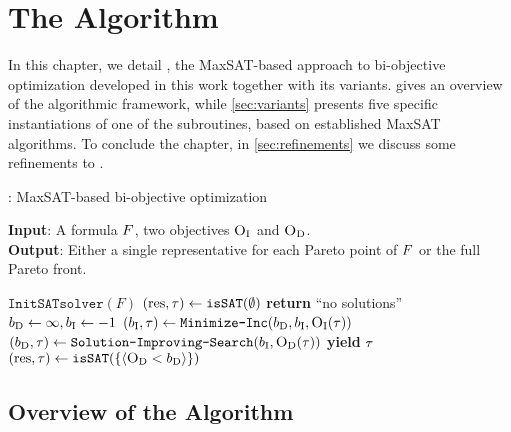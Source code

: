 \chapter{The \algname{} Algorithm\label{chap:approach}}

In this chapter, we detail \algname{}, the MaxSAT-based approach to bi-objective optimization developed in this work together with its variants.
 gives an overview of the algorithmic framework, while \cref{sec:variants} presents five specific instantiations of one of the subroutines, based on established MaxSAT algorithms.
To conclude the chapter, in \cref{sec:refinements} we discuss some refinements to \algname{}.

\begin{algorithm}[t]
  \caption{\algname{}: MaxSAT-based  bi-objective optimization} %
  \label{alg:base-algorithm}
  \textbf{Input}: A formula $F$, two objectives $\textsc{O}_{\text{I}}$ and $\textsc{O}_{\text{D}}$.\\
  \textbf{Output}: Either a single representative for each Pareto point of $F$ or the full Pareto front.

  \begin{algorithmic}[1]
    \STATE $\texttt{InitSATsolver}(F)$ \label{l:init-solv} 
    \STATE $(\text{res}, \tau) \gets \texttt{isSAT}(\emptyset)$ \quad{}\label{l:sols} 
    \IF{$\res=\unsat$}
      \STATE \textbf{return} ``no solutions''
    \ENDIF
    \STATE $b_{\text{D}} \gets \infty, b_{\text{I}} \gets -1$ \label{l:bounds}
    \WHILE{$\res = \sat$} \label{l:loopstart}
      \STATE $(b_{\text{I}}, \tau) \gets \texttt{Minimize-\allowbreak{}Inc}(b_{\text{D}} , b_{\text{I}}, \textsc{O}_{\text{I}}(\tau))$  \quad{}\label{l:minim1}
      \STATE $(b_{\text{D}}, \tau) \gets  \texttt{Solution-\allowbreak{}Improving-\allowbreak{}Search}(b_{\text{I}} , \textsc{O}_{\text{D}}(\tau))$  \quad{}\label{l:minim2}
      \STATE \textbf{yield} $\tau$  \quad{}\label{ln:stage3} 
      \STATE $(\text{res}, \tau) \gets \texttt{isSAT}(\{\langle \textsc{O}_{\text{D}} < b_{\text{D}} \rangle\})$\label{l:endL}
    \ENDWHILE
  \end{algorithmic}
\end{algorithm}

\section{Overview of the Algorithm\label{sec:algorithm}}

